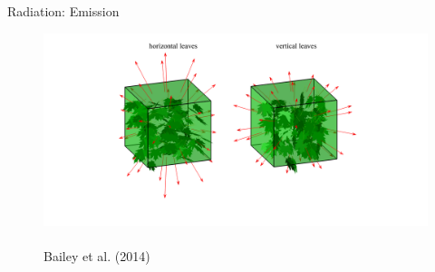 \begin{frame}{Radiation: Emission}
\begin{figure}
	\includegraphics[width=\textwidth]{fig17.png}
	\centering \tiny~\\Bailey et al. (2014)
\end{figure}
\end{frame}


